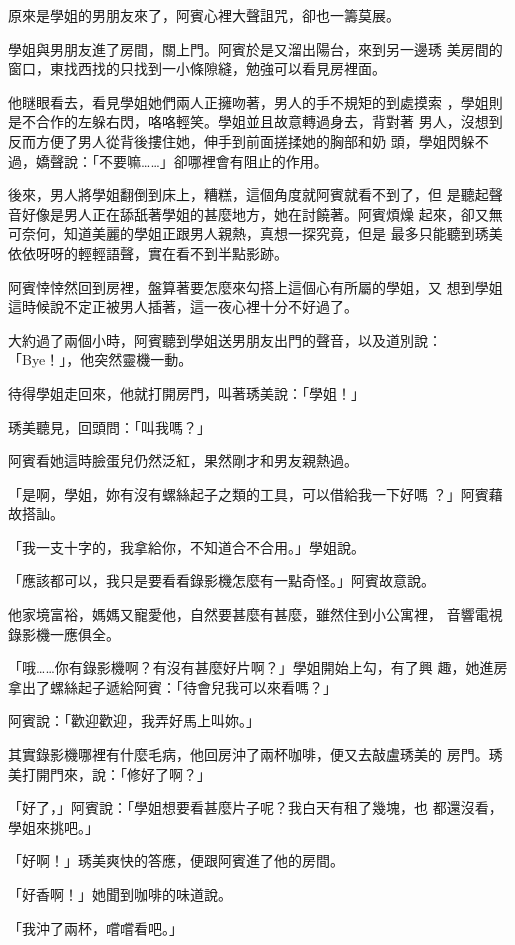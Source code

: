 原來是學姐的男朋友來了，阿賓心裡大聲詛咒，卻也一籌莫展。

學姐與男朋友進了房間，關上門。阿賓於是又溜出陽台，來到另一邊琇
美房間的窗口，東找西找的只找到一小條隙縫，勉強可以看見房裡面。

他瞇眼看去，看見學姐她們兩人正擁吻著，男人的手不規矩的到處摸索
，學姐則是不合作的左躲右閃，咯咯輕笑。學姐並且故意轉過身去，背對著
男人，沒想到反而方便了男人從背後摟住她，伸手到前面搓揉她的胸部和奶
頭，學姐閃躲不過，嬌聲說：「不要嘛……」卻哪裡會有阻止的作用。

後來，男人將學姐翻倒到床上，糟糕，這個角度就阿賓就看不到了，但
是聽起聲音好像是男人正在舔舐著學姐的甚麼地方，她在討饒著。阿賓煩燥
起來，卻又無可奈何，知道美麗的學姐正跟男人親熱，真想一探究竟，但是
最多只能聽到琇美依依呀呀的輕輕語聲，實在看不到半點影跡。

阿賓悻悻然回到房裡，盤算著要怎麼來勾搭上這個心有所屬的學姐，又
想到學姐這時候說不定正被男人插著，這一夜心裡十分不好過了。

大約過了兩個小時，阿賓聽到學姐送男朋友出門的聲音，以及道別說：
「Bye！」，他突然靈機一動。

待得學姐走回來，他就打開房門，叫著琇美說：「學姐！」

琇美聽見，回頭問：「叫我嗎？」

阿賓看她這時臉蛋兒仍然泛紅，果然剛才和男友親熱過。

「是啊，學姐，妳有沒有螺絲起子之類的工具，可以借給我一下好嗎
？」阿賓藉故搭訕。

「我一支十字的，我拿給你，不知道合不合用。」學姐說。

「應該都可以，我只是要看看錄影機怎麼有一點奇怪。」阿賓故意說。

他家境富裕，媽媽又寵愛他，自然要甚麼有甚麼，雖然住到小公寓裡，
音響電視錄影機一應俱全。

「哦……你有錄影機啊？有沒有甚麼好片啊？」學姐開始上勾，有了興
趣，她進房拿出了螺絲起子遞給阿賓：「待會兒我可以來看嗎？」

阿賓說：「歡迎歡迎，我弄好馬上叫妳。」

其實錄影機哪裡有什麼毛病，他回房沖了兩杯咖啡，便又去敲盧琇美的
房門。琇美打開門來，說：「修好了啊？」

「好了，」阿賓說：「學姐想要看甚麼片子呢？我白天有租了幾塊，也
都還沒看，學姐來挑吧。」

「好啊！」琇美爽快的答應，便跟阿賓進了他的房間。

「好香啊！」她聞到咖啡的味道說。

「我沖了兩杯，嚐嚐看吧。」

